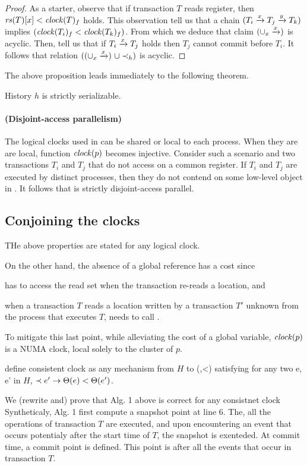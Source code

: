 \begin{proof}
  As a starter, observe that if transaction $T$ reads register, then $\readSetOf{T}[x] < \clockOf{T}_f$ holds.
  This observation tell us that a chain $(T_i \stmPrec{x} T_j \stmPrec{y} T_k)$ implies $(\clockOf{T_i}_f < \clockOf{T_k}_f)$.
  From which we deduce that claim $(\union_{x} \stmPrec{x})$ is acyclic.
  Then,  tell us that if $T_i \stmPrec{x} T_j$ holds then $T_j$ cannot commit before $T_i$.
  It follows that relation $((\union_{x} \stmPrec{x}) ~\union \hb_h)$ is acyclic.  
\end{proof}

The above proposition leads immediately to the following theorem.

\begin{theorem}
  History $h$ is strictly serializable.
\end{theorem}

\paragraph{(Disjoint-access parallelism)}
The logical clocks used in  can be shared or local to each process.
When they are are local, function $\clockOf{p}$ becomes injective.
Consider such a scenario and two transactions $T_i$ and $T_j$ that do not access on a common register.
If $T_i$ and $T_j$ are executed by distinct processes, then they do not contend on some low-level object in .
It follows that  is strictly disjoint-access parallel.

\subsection{Conjoining the clocks}

THe above properties are stated for any logical clock.

On the other hand, the absence of a global reference has a cost since
\begin{inparaenum}[\em(i)]
\item {} has to access the read set when the transaction re-reads a location, and
\item when a transaction $T$ reads a location written by a transaction $T'$  
  unknown from the process that executes $T$,  needs to call \stmExtend{}.
\end{inparaenum}

To mitigate this last point, while alleviating the cost of a global variable, $\clockOf{p}$ is a NUMA clock,
local solely to the cluster of $p$.

define consistent clock as any mechanism from $H$ to (\tickSet,<)
satisfying for any two e, e' in $H$, $\hb e' \implies \Theta(e) < \Theta(e')$.

We (rewrite and) prove that Alg. 1 above is correct for any consistnet clock 
Syntheticaly, Alg. 1 first compute a snapshot point at line 6.
The, all the operations of transaction $T$ are executed, and upon encountering 
an event that occurs potentialy after the start time of $T$, the snapshot is exenteded.
At commit time, a commit point is defined. 
This point is after all the events that occur in transaction $T$.
